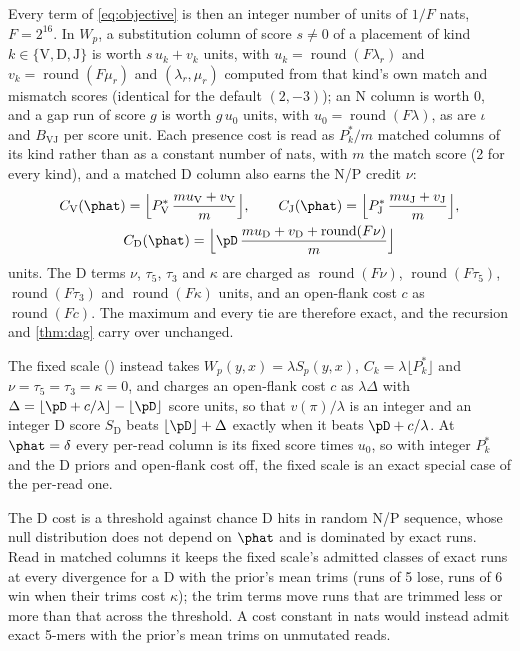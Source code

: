 \documentclass[11pt,a4paper]{article}
\begin{document}
Every term of \cref{eq:objective} is then an integer number of units of
$1/F$ nats, $F=2^{16}$. In $W_p$, a substitution column of score $s\neq0$ of
a placement of kind $k\in\{\mathrm V,\mathrm D,\mathrm J\}$ is worth
$s\,u_k+v_k$ units, with $u_k=\operatorname{round}(F\lambda_r)$ and
$v_k=\operatorname{round}(F\mu_r)$ and $(\lambda_r,\mu_r)$ computed from that
kind's own match and mismatch scores (identical for the default $(2,-3)$); an
N column is worth 0, and a gap run of score $g$ is worth $g\,u_0$ units, with
$u_0=\operatorname{round}(F\lambda)$, as are $\iota$ and $B_{\mathrm{VJ}}$
per score unit. Each presence cost is read as $P^{*}_k/m$ matched columns of
its kind rather than as a constant number of nats, with $m$ the match score
(2 for every kind), and a matched D column also earns the N/P credit $\nu$:
\begin{equation}
\begin{gathered}
  C_{\mathrm V}(\phat)=\Bigl\lfloor P^{*}_{\mathrm V}\,\frac{m u_{\mathrm V}+v_{\mathrm V}}{m}\Bigr\rfloor,\qquad
  C_{\mathrm J}(\phat)=\Bigl\lfloor P^{*}_{\mathrm J}\,\frac{m u_{\mathrm J}+v_{\mathrm J}}{m}\Bigr\rfloor,\\
  C_{\mathrm D}(\phat)=\Bigl\lfloor \pD\,\frac{m u_{\mathrm D}+v_{\mathrm D}+\operatorname{round}(F\nu)}{m}\Bigr\rfloor
\end{gathered}
  \label{eq:presence-read}
\end{equation}
units. The D terms $\nu$, $\tau_5$, $\tau_3$ and $\kappa$ are charged as
$\operatorname{round}(F\nu)$, $\operatorname{round}(F\tau_5)$,
$\operatorname{round}(F\tau_3)$ and $\operatorname{round}(F\kappa)$ units,
and an open-flank cost $c$ as $\operatorname{round}(Fc)$. The maximum and
every tie are therefore exact, and the recursion and \cref{thm:dag} carry
over unchanged.

The fixed scale () instead takes
$W_p(y,x)=\lambda S_p(y,x)$, $C_k=\lambda\lfloor P^{*}_k\rfloor$ and
$\nu=\tau_5=\tau_3=\kappa=0$, and charges an open-flank cost $c$ as
$\lambda\Delta$ with $\Delta=\lfloor\pD+c/\lambda\rfloor-\lfloor\pD\rfloor$
score units, so that $v(\pi)/\lambda$ is an integer and an integer D score
$S_{\mathrm D}$ beats $\lfloor\pD\rfloor+\Delta$ exactly when it beats
$\pD+c/\lambda$. At $\phat=\delta$ every per-read column is its fixed score
times $u_0$, so with integer $P^{*}_k$ and the D priors and open-flank cost
off, the fixed scale is an exact special case of the per-read one.

The D cost is a threshold against
chance D hits in random N/P sequence, whose null distribution does not depend
on $\phat$ and is dominated by exact runs. Read in matched columns it keeps
the fixed scale's admitted classes of exact runs at every divergence for a D
with the prior's mean trims (runs of 5 lose, runs of 6 win when their trims
cost $\kappa$); the trim terms move runs that are trimmed less or more than
that across the threshold. A cost constant in nats would instead admit
exact 5-mers with the prior's mean trims on unmutated reads.
\end{document}
